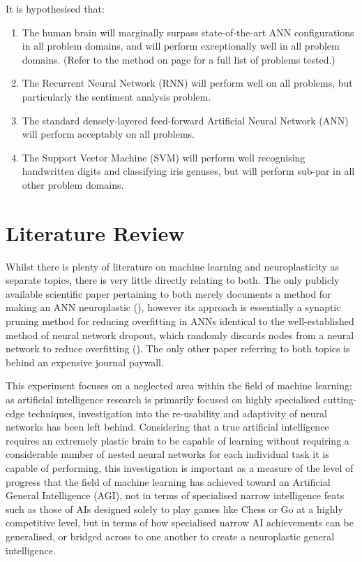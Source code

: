 \documentclass[]{report}
\begin{document}
It is hypothesised that:
\begin{enumerate}
	\item The human brain will marginally surpass state-of-the-art ANN configurations in all problem domains, and will perform exceptionally well in all problem domains. (Refer to the method on page \pageref{itm:Method} for a full list of problems tested.)
	\item The Recurrent Neural Network (RNN) will perform well on all problems, but particularly the sentiment analysis problem.
	\item The standard densely-layered feed-forward Artificial Neural Network (ANN) will perform acceptably on all problems.
	\item The Support Vector Machine (SVM) will perform well recognising handwritten digits and classifying iris genuses, but will perform sub-par in all other problem domains.
\end{enumerate}

\section{Literature Review}

Whilst there is plenty of literature on machine learning and neuroplasticity as separate topics, there is very little directly relating to both. The only publicly available scientific paper pertaining to both merely documents a method for making an ANN neuroplastic (\cite{perwej12}), however its approach is essentially a synaptic pruning method for reducing overfitting in ANNs identical to the well-established method of neural network dropout, which randomly discards nodes from a neural network to reduce overfitting (\cite{dropout14}). The only other paper referring to both topics is behind an expensive journal paywall.

This experiment focuses on a neglected area within the field of machine learning: as artificial intelligence research is primarily focused on highly specialised cutting-edge techniques, investigation into the re-usability and adaptivity of neural networks has been left behind. Considering that a true artificial intelligence requires an extremely plastic brain to be capable of learning without requiring a considerable number of nested neural networks for each individual task it is capable of performing, this investigation is important as a measure of the level of progress that the field of machine learning has achieved toward an Artificial General Intelligence (AGI), not in terms of specialised narrow intelligence feats such as those of AIs designed solely to play games like Chess or Go at a highly competitive level, but in terms of how specialised narrow AI achievements can be generalised, or bridged across to one another to create a neuroplastic general intelligence.
\end{document}
